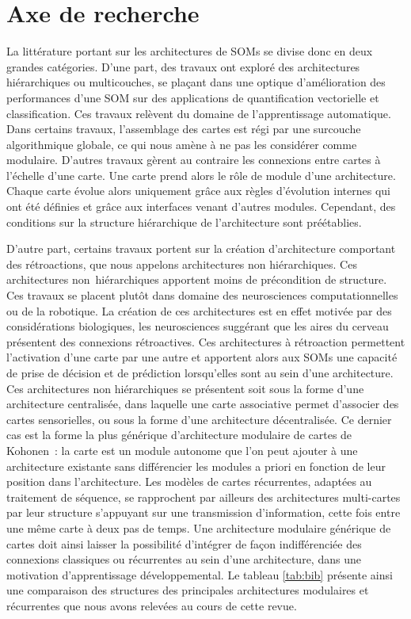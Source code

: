 \documentclass[../main]{subfiles}
\begin{document}
\section{Axe de recherche}

La littérature portant sur les architectures de SOMs se divise donc en deux grandes catégories. D'une part, des travaux ont exploré des architectures hiérarchiques ou multicouches, se plaçant dans une optique d'amélioration des performances d'une SOM sur des applications de quantification vectorielle et classification. Ces travaux relèvent du domaine de l'apprentissage automatique. 
Dans certains travaux, l'assemblage des cartes est régi par une surcouche algorithmique globale, ce qui nous amène à ne pas les considérer comme modulaire. 
D'autres travaux gèrent au contraire les connexions entre cartes à l'échelle d'une carte. Une carte prend alors le rôle de module d'une architecture. Chaque carte évolue alors uniquement grâce aux règles d'évolution internes qui ont été définies et grâce aux interfaces venant d'autres modules. Cependant, des conditions sur la structure hiérarchique de l'architecture sont préétablies.

D'autre part, certains travaux portent sur la création d'architecture comportant des rétroactions, que nous appelons architectures non hiérarchiques. Ces architectures non~hiérarchiques apportent moins de précondition de structure.
Ces travaux se placent plutôt dans domaine des neurosciences computationnelles ou de la robotique. La création de ces architectures est en effet motivée par des considérations biologiques, les neurosciences suggérant que les aires du cerveau présentent des connexions rétroactives. 
Ces architectures à rétroaction permettent l'activation d'une carte par une autre et apportent alors aux SOMs une capacité de prise de décision et de prédiction lorsqu'elles sont au sein d'une architecture. Ces architectures non hiérarchiques se présentent soit sous la forme d'une architecture centralisée, dans laquelle une carte associative permet d'associer des cartes sensorielles, ou sous la forme d'une architecture décentralisée. 
Ce dernier cas est la forme la plus générique d'architecture modulaire de cartes de Kohonen~: la carte est un module autonome que l'on peut ajouter à une architecture existante sans différencier les modules a priori en fonction de leur position dans l'architecture.
Les modèles de cartes récurrentes, adaptées au traitement de séquence, se rapprochent par ailleurs des architectures multi-cartes par leur structure s'appuyant sur une transmission d'information, cette fois entre une même carte à deux pas de temps. 
Une architecture modulaire générique de cartes doit ainsi laisser la possibilité d'intégrer de façon indifférenciée des connexions classiques ou récurrentes au sein d'une architecture, dans une motivation d'apprentissage développemental.
Le tableau \ref{tab:bib} présente ainsi une comparaison des structures des principales architectures modulaires et récurrentes que nous avons relevées au cours de cette revue. 
\end{document}
